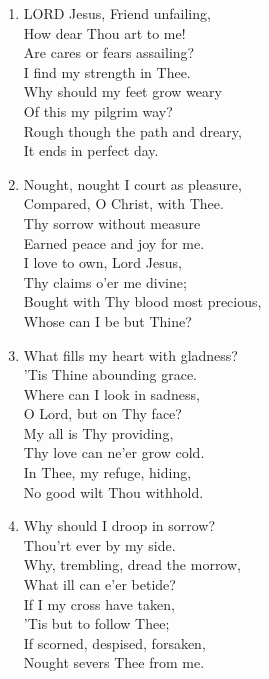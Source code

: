 \begin{enumerate}
    \item LORD Jesus, Friend unfailing, \\
            How dear Thou art to me! \\
        Are cares or fears assailing? \\
            I find my strength in Thee. \\
        Why should my feet grow weary \\
            Of this my pilgrim way? \\
        Rough though the path and dreary, \\
            It ends in perfect day.

    \item Nought, nought I court as pleasure, \\
            Compared, O Christ, with Thee. \\
        Thy sorrow without measure \\
            Earned peace and joy for me. \\
        I love to own, Lord Jesus, \\
            Thy claims o'er me divine; \\
        Bought with Thy blood most precious, \\
            Whose can I be but Thine?

    \item What fills my heart with gladness? \\
            'Tis Thine abounding grace. \\
        Where can I look in sadness, \\
            O Lord, but on Thy face? \\
        My all is Thy providing, \\
            Thy love can ne'er grow cold. \\
        In Thee, my refuge, hiding, \\
            No good wilt Thou withhold.

    \item Why should I droop in sorrow? \\
            Thou'rt ever by my side. \\
        Why, trembling, dread the morrow, \\
            What ill can e'er betide? \\
        If I my cross have taken, \\
            'Tis but to follow Thee; \\
        If scorned, despised, forsaken, \\
            Nought severs Thee from me.


\end{enumerate}
